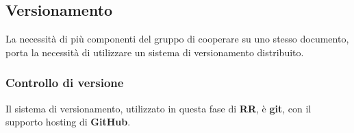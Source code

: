 \subsection{Versionamento}\label{ProcessiSupporto_Versionamento}
La necessità di più componenti del gruppo di cooperare su uno stesso documento, porta la necessità di utilizzare un sistema di versionamento distribuito. 



\subsubsection{Controllo di versione}
Il sistema di versionamento, utilizzato in questa fase di \textbf{RR}, è \textbf{git}, con il supporto hosting di \textbf{GitHub}.

